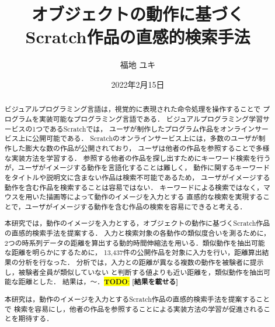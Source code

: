 \documentclass[11pt]{jreport}
\title{オブジェクトの動作に基づく\\
	Scratch作品の直感的検索手法}
\author{福地 ユキ}
\date{2022年2月15日}	%
\newcommand{\todo}[1]{\colorbox{yellow}{{\bf TODO}:}{\color{red} {\textbf{[#1]}}}}
\begin{document}
\maketitle

\begin{abstract}

ビジュアルプログラミング言語は，視覚的に表現された命令処理を操作することで
プログラムを実装可能なプログラミング言語である．
ビジュアルプログラミング学習サービスの1つであるScratchでは，
ユーザが制作したプログラム作品をオンラインサービス上に公開可能である．
Scratchのオンラインサービス上には，多数のユーザが制作した膨大な数の作品が公開されており，
ユーザは他者の作品を参照することで多様な実装方法を学習する．
参照する他者の作品を探し出すためにキーワード検索を行うが，ユーザがイメージする動作を言語化することは難しく，
動作に関するキーワードをタイトルや説明文に含まない作品は検索不可能であるため，
ユーザがイメージする動作を含む作品を検索することは容易ではない．
キーワードによる検索ではなく，マウスを用いた描画等によって動作のイメージを入力とする
直感的な検索を実現することで，ユーザがイメージする動作を含む作品の検索を容易にできると考える．

本研究では，動作のイメージを入力とする，オブジェクトの動作に基づくScratch作品の直感的検索手法を提案する．
入力と検索対象の各動作の類似度合いを測るために，
2つの時系列データの距離を算出する動的時間伸縮法を用いる．類似動作を抽出可能な距離を明らかにするために，
13,437件の公開作品を対象に入力を行い，距離算出結果の分析を行なった．
分析では，入力との距離が異なる複数の動作を被験者に提示し，被験者全員が類似していない
と判断する値よりも近い距離を，類似動作を抽出可能な距離とした．
結果は，〜．\todo{結果を載せる}

本研究は，動作のイメージを入力とするScratch作品の直感的検索手法を提案することで
検索を容易にし，他者の作品を参照することによる実装方法の学習が促進されることを期待する．

\end{abstract}

\tableofcontents



\newpage
{}	%


\end{document}
